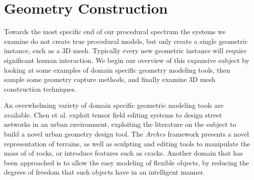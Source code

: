 





\section{Geometry Construction}
\label{sec:construction}

Towards the most specific end of our procedural spectrum the systems we examine do not create true procedural models, but only create a single geometric instance, such as a 3D mesh. Typically every new geometric instance will require significant human interaction. We begin our overview of this expansive subject by looking at some examples of domain specific geometry modeling tools, then sample some geometry capture methods, and finally examine 3D mesh construction techniques. 


An overwhelming variety of domain specific geometric modeling tools are available. Chen et al. exploit tensor field editing systems to design street networks in an urban environment\cite{Chen08}, exploiting the literature on the subject to build a novel urban geometry design tool. The \emph{Arches}\cite{Peytavie09} framework presents a novel representation of terrains, as well as sculpting and editing tools to manipulate the mass of of rocks, or introduce features such as cracks. Another domain that has been approached is to allow the easy modeling of flexible objects\cite{Wang12}, by reducing the degrees of freedom that such objects have in an intelligent manner.

